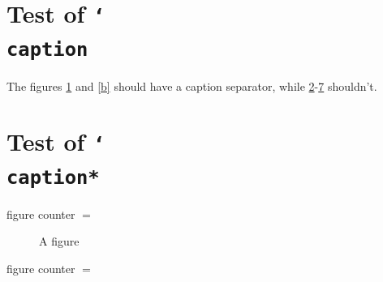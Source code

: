 \documentclass{article}
\DeclareRobustCommand\cs[1]{\texttt{\char`\\#1}}
\begin{document}
\section{Test of \cs{caption}}

\begin{figure}[!ht]
\caption{\figurename}\label{a}
\end{figure}

\begingroup
{}\label{b}
\endgroup

\begin{figure}[!ht]
\caption{}\label{c} %
\end{figure}

\begin{figure}[!ht]
\caption{ }\label{d} %
\end{figure}

\begin{figure}[!ht]
\caption{\ignorespaces}\label{e} %
\end{figure}

\begin{figure}[!ht]
\caption{\label{f}} %
\end{figure}

\begin{figure}[!ht]
\caption{ \label{g} } %
\end{figure}

\begin{figure}[!ht]
\caption{\ignorespaces\label{h}} %
\end{figure}

The figures \ref{a} and \ref{b} should have a caption separator,
while \ref{c}-\ref{h} shouldn't.

\section{Test of \cs{caption*}}

figure counter $=$ 

\begin{figure}[!ht]
\caption*{A figure}
\end{figure}

\begingroup
{}
\endgroup

figure counter $=$ 
\end{document}
